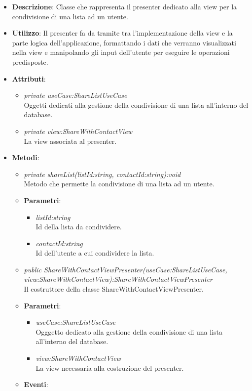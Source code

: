\begin{itemize}
\item \textbf{Descrizione}: Classe che rappresenta il presenter dedicato alla view per la condivisione di una lista ad un utente.
\item \textbf{Utilizzo}: Il presenter fa da tramite tra l'implementazione della view e la parte logica dell'applicazione, formattando i dati che verranno visualizzati nella view e manipolando gli input dell'utente per eseguire le operazioni predisposte.
\item \textbf{Attributi}: 
\begin{itemize}
\item \textit{private useCase:ShareListUseCase}\\
	Oggetti dedicati alla gestione della condivisione di una lista all'interno del database.
\item \textit{private view:ShareWithContactView}\\
	La view associata al presenter.
\end{itemize}
\item \textbf{Metodi}:
\begin{itemize}
\item \textit{private shareList(listId:string, contactId:string):void}\\
	Metodo che permette la condivisione di una lista ad un utente.
	\item{\textbf{Parametri}: \begin{itemize}
	\item \textit{listId:string}\\
	Id della lista da condividere.
	\item \textit{contactId:string}\\
	Id dell'utente a cui condividere la lista.
	\end{itemize}}
\item \textit{public ShareWithContactViewPresenter(useCase:ShareListUseCase, view:ShareWithContactView):ShareWithContactViewPresenter}\\
	Il costruttore della classe ShareWithContactViewPresenter.
		\item{\textbf{Parametri}: \begin{itemize}
			\item \textit{useCase:ShareListUseCase}\\
			Ogggetto dedicato alla gestione della condivisione di una lista all'interno del database.
			\item \textit{view:ShareWithContactView}\\
			La view necessaria alla costruzione del presenter.
\end{itemize}}
\item \textbf{Eventi}:
\end{itemize}
\end{itemize}

